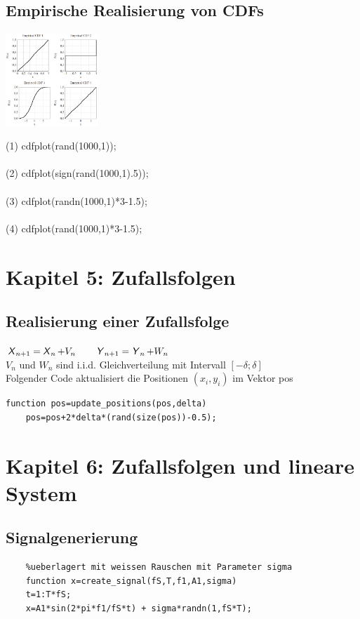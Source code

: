 \documentclass[deutsch]{latex4ei/latex4ei_sheet}
\begin{document}
\begin{sectionbox}
	\subsection{Empirische Realisierung von CDFs}	
	\parbox{3.5cm}{
		\includegraphics[width = 3.5cm]{img/cdf-sample.png}
	}
	\parbox{3.5cm}{
		(1)	cdfplot(rand(1000,1)); \\\\
		(2)	cdfplot(sign(rand(1000,1).5)); \\\\
		(3)	cdfplot(randn(1000,1)*3-1.5); \\\\
		(4)	cdfplot(rand(1000,1)*3-1.5);
		}
\end{sectionbox}

\section{Kapitel 5: Zufallsfolgen}
\begin{sectionbox}
	\subsection{Realisierung einer Zufallsfolge}
	$\operatorname{\textsf{\textit{X}}}_{n+1}=\operatorname{\textsf{\textit{X}}}_n+V_n \qquad \operatorname{\textsf{\textit{Y}}}_{n+1}=\operatorname{\textsf{\textit{Y}}}_n+W_n$ \\
	$V_n$ und $W_n$ sind i.i.d. Gleichverteilung mit Intervall $[-\delta;\delta]$\\
	Folgender Code aktualisiert die Positionen $(x_i,y_i)$ im Vektor pos
	\begin{lstlisting}[gobble=4]
	function pos=update_positions(pos,delta)
	pos=pos+2*delta*(rand(size(pos))-0.5);
	\end{lstlisting}
\end{sectionbox}

\section{Kapitel 6: Zufallsfolgen und lineare System}
\begin{sectionbox}
	\subsection{Signalgenerierung}
	\begin{lstlisting}[gobble=4]
	%Erstellt Sinussignal der Frequenz f1 mit der Amplitude A1,
	%ueberlagert mit weissen Rauschen mit Parameter sigma
	function x=create_signal(fS,T,f1,A1,sigma)
	t=1:T*fS;
	x=A1*sin(2*pi*f1/fS*t) + sigma*randn(1,fS*T);
	\end{lstlisting}
\end{sectionbox}
\end{document}
